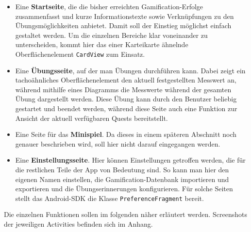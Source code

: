 \begin{itemize}
	\item Eine \textbf{Startseite}, die die bisher erreichten Gamification-Erfolge zusammenfasst und kurze Informationstexte sowie Verknüpfungen zu den Übungsmöglichkeiten anbietet. Damit soll der Einstieg möglichst einfach gestaltet werden. Um die einzelnen Bereiche klar voneinander zu unterscheiden, kommt hier das einer Karteikarte ähnelnde Oberflächenelement \texttt{CardView} zum Einsatz.
	\item Eine \textbf{Übungsseite}, auf der man Übungen durchführen kann. Dabei zeigt ein tachoähnliches Oberflächenelement den aktuell festgestellten Messwert an, während mithilfe eines Diagramms die Messwerte während der gesamten Übung dargestellt werden. Diese Übung kann durch den Benutzer beliebig gestartet und beendet werden, während diese Seite auch eine Funktion zur Ansicht der aktuell verfügbaren Quests bereitstellt.
	\item Eine Seite für das \textbf{Minispiel}. Da dieses in einem späteren Abschnitt noch genauer beschrieben wird, soll hier nicht darauf eingegangen werden.
	\item Eine \textbf{Einstellungsseite}. Hier können Einstellungen getroffen werden, die für die restlichen Teile der App von Bedeutung sind. So kann man hier den eigenen Namen einstellen, die Gamification-Datenbank importieren und exportieren und die Übungserinnerungen konfigurieren. Für solche Seiten stellt das Android-SDK die Klasse \texttt{PreferenceFragment} bereit.
\end{itemize}
Die einzelnen Funktionen sollen im folgenden näher erläutert werden. Screenshots der jeweiligen Activities befinden sich im Anhang.
\newpage
